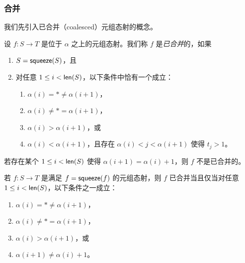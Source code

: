 \subsubsection{合并}
\label{subsubsection.coalesce}

\noindent 我们先引入已合并（coalesced）元组态射的概念。
\begin{definition}\label{definitionofcoalescedmorphisminC}
    设 $f:S \to T$ 是位于 $\alpha$ 之上的元组态射。我们称 $f$ 是{\it 已合并}的，如果
    \begin{enumerate}
        \item $S = \mathsf{squeeze}(S)$，且
        \item 对任意 $ 1 \leq i < \mathsf{len}(S)$，以下条件中恰有一个成立： 
        \begin{enumerate}
            \item $\alpha(i) = * \neq \alpha(i+1)$，
            \item $\alpha(i) \neq *=\alpha(i+1)$，
            \item $\alpha(i) > \alpha(i+1)$，或 
            \item $\alpha(i)<\alpha(i+1)$，且存在 $ \alpha(i) < j < \alpha(i+1)$ 使得 $t_j > 1$。 
        \end{enumerate}
    \end{enumerate}
\end{definition}

\begin{example}
    若存在某个 $1 \leq i < \mathsf{len}(S)$ 使得 $\alpha(i+1) = \alpha(i)+1$，则 $f$ 不是已合并的。
\end{example}

\begin{remark}
    若 $f:S \to T$ 是满足 $f = \mathsf{squeeze}(f)$ 的元组态射，则 $f$ 已合并当且仅当对任意 $1 \leq i < \mathsf{len}(S)$，以下条件之一成立：
    \begin{enumerate}
            \item $\alpha(i) = * \neq \alpha(i+1)$，
            \item $\alpha(i) \neq * = \alpha(i+1)$，
            \item $\alpha(i) > \alpha(i+1)$，或
            \item $\alpha(i+1) \neq \alpha(i) + 1$。
    \end{enumerate}
\end{remark}

